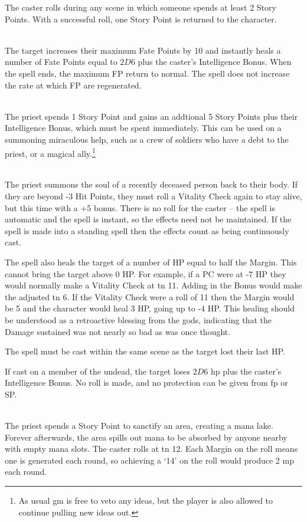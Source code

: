 \begin{multicols}{2}
The caster rolls during any scene in which someone spends at least 2 Story Points.  With a successful roll, one Story Point is returned to the character.

\spelllevel

\\
The target increases their maximum Fate Points by 10 and instantly heals a number of Fate Points equal to $2D6$ plus the caster's Intelligence Bonus. When the spell ends, the maximum FP return to normal. The spell does not increase the rate at which FP are regenerated.

\spelllevel

\\
The priest spends 1 Story Point and gains an addtional 5 Story Points plus their Intelligence Bonus, which must be spent immediately.  This can be used on a summoning miraculous help, such as a crew of soldiers who have a debt to the priest, or a magical ally.\footnote{As usual \gls{gm} is free to veto any ideas, but the player is also allowed to continue pulling new ideas out.}

\\
The priest summons the soul of a recently deceased person back to their body. If they are beyond -3 Hit Points, they must roll a Vitality Check again to stay alive, but this time with a +5 bonus. There is no roll for the caster -- the spell is automatic and the spell is instant, so the effects need not be maintained. If the spell is made into a standing spell then the effects count as being continuously cast.

The spell also heals the target of a number of HP equal to half the Margin. This cannot bring the target above 0 HP. For example, if a PC were at -7 HP they would normally make a Vitality Check at \gls{tn} 11. Adding in the Bonus would make the adjusted \gls{tn} 6. If the Vitality Check were a roll of 11 then the Margin would be 5 and the character would heal 3 HP, going up to -4 HP. This healing should be understood as a retroactive blessing from the gods, indicating that the Damage sustained was not nearly so bad as was once thought.

The spell must be cast within the same scene as the target lost their last HP.

If cast on a member of the undead, the target loses $2D6$ \gls{hp} plus the caster's Intelligence Bonus.
No roll is made, and no protection can be given from \gls{fp} or \gls{SP}.

\\
The priest spends a Story Point to sanctify an area, creating a mana lake.
Forever afterwards, the area spills out mana to be absorbed by anyone nearby with empty mana slots.
The caster rolls at \gls{tn} 12.
Each Margin on the roll means one  is generated each round, so achieving a `14' on the roll would produce 2 \gls{mp} each round.

\end{multicols}


